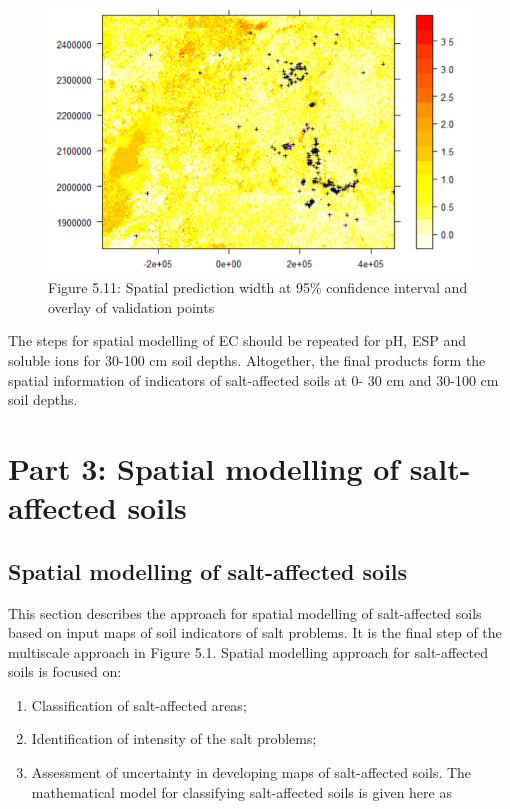 \documentclass[
  10pt,
  b5paper,
]{book}
\providecommand{\tightlist}{%
  \setlength{\itemsep}{0pt}\setlength{\parskip}{0pt}}
\begin{document}
\begin{figure}
\centering
\includegraphics{figures/images/Figure5.11.png}
\caption{Figure 5.11: Spatial prediction width at 95\% confidence interval and overlay of validation points}
\end{figure}

The steps for spatial modelling of EC should be repeated for pH, ESP and soluble ions for 30-100 cm soil depths. Altogether, the final products form the spatial information of indicators of salt-affected soils at 0- 30 cm and 30-100 cm soil depths.

\hypertarget{part-3-spatial-modelling-of-salt-affected-soils}{%
\section{Part 3: Spatial modelling of salt-affected soils}\label{part-3-spatial-modelling-of-salt-affected-soils}}

\hypertarget{spatial-modelling-of-salt-affected-soils}{%
\subsection{Spatial modelling of salt-affected soils}\label{spatial-modelling-of-salt-affected-soils}}

This section describes the approach for spatial modelling of salt-affected soils based on input maps of soil indicators of salt problems. It is the final step of the multiscale approach in Figure 5.1. Spatial modelling approach for salt-affected soils is focused on:

\begin{enumerate}
\def\labelenumi{\arabic{enumi})}
\tightlist
\item
  Classification of salt-affected areas;
\item
  Identification of intensity of the salt problems;
\item
  Assessment of uncertainty in developing maps of salt-affected soils. The mathematical model for classifying salt-affected soils is given here as
\end{enumerate}
\end{document}
